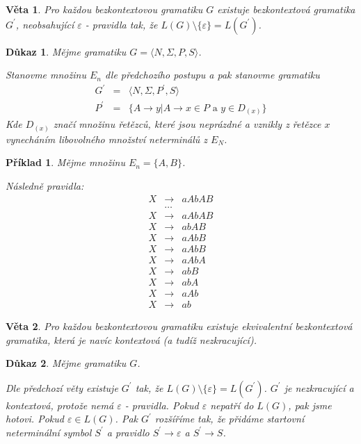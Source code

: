 \documentclass[10pt, a4paper, titlepage]{article}
\theoremstyle{note}
\newtheorem{veta}{Věta}
\newtheorem{dukaz}{Důkaz}
\newtheorem{priklad}{Příklad}
\begin{document}
\begin{veta}
Pro každou bezkontextovou gramatiku $G$ existuje bezkontextová gramatika $G^{'}$, neobsahující $\varepsilon$ - pravidla tak, že $L(G) \setminus \lbrace \varepsilon \rbrace = L(G^{'})$.
\end{veta}

\begin{dukaz}
Mějme gramatiku $G = \langle N, \Sigma, P,S \rangle$.

Stanovme množinu $E_{n}$ dle předchozího postupu a pak stanovme gramatiku
\begin{eqnarray*}
G^{'} &=& \langle N, \Sigma, P^{'},S \rangle \\
P^{'} &=& \lbrace A \rightarrow y|A \rightarrow x \in P \text{ a } y \in D_{(x)} \rbrace
\end{eqnarray*}
Kde $D_{(x)}$ značí množinu řetězců, které jsou neprázdné a vznikly z řetězce $x$ vynecháním
libovolného množství neterminálů z $E_{N}$.
\end{dukaz}

\begin{priklad}
Mějme množinu $E_{n} = \lbrace A, B \rbrace$.

Následně pravidla:
\begin{eqnarray*}
X &\rightarrow& aAbAB \\
&\ldots& \\
X &\rightarrow& aAbAB \\
X &\rightarrow& abAB \\
X &\rightarrow& aAbB \\
X &\rightarrow& aAbB \\
X &\rightarrow& aAbA \\
X &\rightarrow& abB \\
X &\rightarrow& abA \\
X &\rightarrow& aAb \\
X &\rightarrow& ab
\end{eqnarray*}
\end{priklad}

\begin{veta}
Pro každou bezkontextovou gramatiku existuje ekvivalentní bezkontextová gramatika, která je navíc kontextová (a tudíž nezkracující).
\end{veta}

\begin{dukaz}
Mějme gramatiku $G$.

Dle předchozí věty existuje $G^{'}$ tak, že $L(G) \setminus \lbrace \varepsilon \rbrace = L(G^{'})$.
$G^{'}$ je nezkracující a kontextová, protože nemá $\varepsilon$ - pravidla. Pokud $\varepsilon$ nepatří do $L(G)$, pak jsme hotovi.
Pokud $\varepsilon \in L(G)$. Pak $G^{'}$ rozšíříme tak, že přidáme startovní neterminální symbol $S^{'}$ 
a pravidlo $S^{'} \rightarrow \varepsilon$ a $S^{'} \rightarrow S$.
\end{dukaz}
\end{document}
